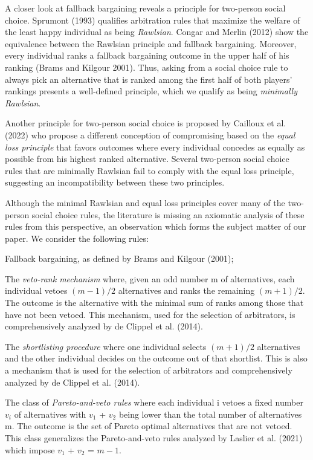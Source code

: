\documentclass[version=3.21, pagesize, twoside=off, bibliography=totoc, DIV=calc, fontsize=12pt, a4paper]{scrartcl}
\begin{document}
A closer look at fallback bargaining reveals a principle for two-person social choice. Sprumont (1993) qualifies arbitration rules that maximize the welfare of the least happy individual as being \textit{Rawlsian}. Congar and Merlin (2012) show the equivalence between the Rawlsian principle and fallback bargaining. Moreover, every individual ranks a fallback bargaining outcome in the upper half of his ranking (Brams and Kilgour 2001). Thus, asking from a social choice rule to always pick an alternative that is ranked among the first half of both players’ rankings presents a well-defined principle, which we qualify as being \textit{minimally Rawlsian}. 

Another principle for two-person social choice is proposed by Cailloux et al. (2022) who propose a different conception of compromising based on the \textit{equal loss principle} that favors outcomes where every individual concedes as equally as possible from his highest ranked alternative. Several two-person social choice rules that are minimally Rawlsian fail to comply with the equal loss principle, suggesting an incompatibility between these two principles.
 
Although the minimal Rawlsian and equal loss principles cover many of the two-person social choice rules, the literature is missing an axiomatic analysis of these rules from this perspective, an observation which forms the subject matter of our paper. We consider the following rules:

Fallback bargaining, as defined by Brams and Kilgour (2001);

The \textit{veto-rank mechanism} where, given an odd number m of alternatives, each individual vetoes $(m−1) / 2$ alternatives and ranks the remaining $(m+1) / 2$. The outcome is the alternative with the minimal sum of ranks among those that have not been vetoed. This mechanism, used for the selection of arbitrators, is comprehensively analyzed by de Clippel et al. (2014).


The \textit{shortlisting procedure} where one individual selects $(m+1) / 2$ alternatives and the other individual decides on the outcome out of that shortlist. This is also a mechanism that is used for the selection of arbitrators and comprehensively analyzed by de Clippel et al. (2014).


The class of \textit{Pareto-and-veto rules} where each individual i vetoes a fixed number $v_i$ of alternatives with $v_1$ + $v_2$ being lower than the total number of alternatives m. The outcome is the set of Pareto optimal alternatives that are not vetoed. This class generalizes the Pareto-and-veto rules analyzed by Laslier et al. (2021) which impose $v_1$ + $v_2$ = $m-1$.
  
\end{document}
